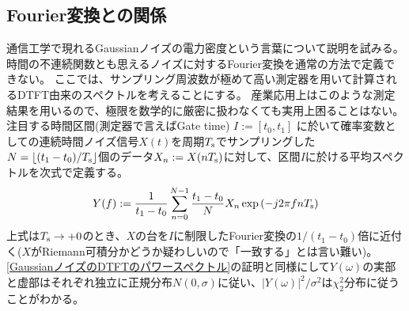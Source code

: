         \subsection{Fourier変換との関係}
            通信工学で現れるGaussianノイズの電力密度という言葉について説明を試みる。
            時間の不連続関数とも思えるノイズに対するFourier変換を通常の方法で定義できない。
            ここでは、サンプリング周波数が極めて高い測定器を用いて計算されるDTFT由来のスペクトルを考えることにする。
            産業応用上はこのような測定結果を用いるので、極限を数学的に厳密に扱わなくても実用上困ることはない。
            注目する時間区間(測定器で言えばGate time) $I := [t_0,t_1]$ に於いて確率変数としての連続時間ノイズ信号$X(t)$を周期$T_\text{s}$でサンプリングした$N = \lfloor(t_1-t_0)/T_\text{s}\rfloor$個のデータ$X_n := X(nT_\text{s})$に対して、区間$I$に於ける平均スペクトルを次式で定義する。
            \[ Y(f) := \frac{1}{t_1-t_0}\sum_{n=0}^{N-1} \frac{t_1-t_0}{N} X_n \exp\left(-j2\pi f nT_\text{s}\right) \]
            上式は$T_\text{s}\to +0$のとき、$X$の台を$I$に制限したFourier変換の$1/(t_1-t_0)$倍に近付く($X$がRiemann可積分かどうか疑わしいので「一致する」とは言い難い)。
            \ref{GaussianノイズのDTFTのパワースペクトル}の証明と同様にして$Y(\omega)$の実部と虚部はそれぞれ独立に正規分布$N(0,\sigma)$に従い、$|Y(\omega)|^2/\sigma^2$は$\chi_2^2$分布に従うことがわかる。
